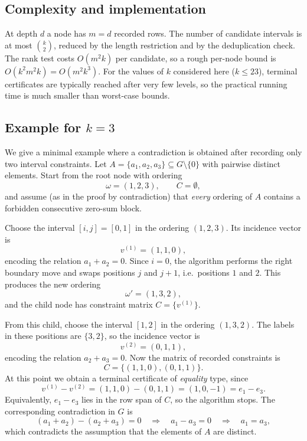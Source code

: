 \documentclass[11pt]{amsart}
\theoremstyle{definition}
\begin{document}
\subsection*{Complexity and implementation}

At depth $d$ a node has $m=d$ recorded rows.  The number of candidate intervals
is at most $\binom{k}{2}$, reduced by the length restriction and by the
deduplication check.  The rank test costs $O(m^2k)$ per candidate, so a rough
per-node bound is $O(k^2 m^2 k)=O(m^2 k^3)$.  For the values of $k$ considered
here ($k\le 23$), terminal certificates are typically reached after very few
levels, so the practical running time is much smaller than worst-case bounds.

\subsection*{Example  for $k=3$}

We give a minimal example where a contradiction is obtained after recording only
two interval constraints.  Let $A=\{a_1,a_2,a_3\}\subseteq G\setminus\{0\}$ with
pairwise distinct elements.  Start from the root node with ordering
\[
\omega=(1,2,3),\qquad C=\emptyset,
\]
and assume (as in the proof by contradiction) that \emph{every} ordering of $A$
contains a forbidden consecutive zero-sum block.

Choose the interval $[i,j]=[0,1]$ in the ordering $(1,2,3)$.  Its incidence
vector is
\[
v^{(1)}=(1,1,0),
\]
encoding the relation $a_1+a_2=0$.  Since $i=0$, the algorithm performs the
right boundary move and swaps positions $j$ and $j+1$, i.e.\ positions $1$ and
$2$.  This produces the new ordering
\[
\omega'=(1,3,2),
\]
and the child node has constraint matrix $C=\{v^{(1)}\}$.

From this child, choose the interval $[1,2]$ in the ordering $(1,3,2)$.  The
labels in these positions are $\{3,2\}$, so the incidence vector is
\[
v^{(2)}=(0,1,1),
\]
encoding the relation $a_2+a_3=0$.  Now the matrix of recorded constraints is
\[
C=\{(1,1,0),(0,1,1)\}.
\]
At this point we obtain a terminal certificate of \emph{equality} type, since
\[
v^{(1)}-v^{(2)}=(1,1,0)-(0,1,1)=(1,0,-1)=e_1-e_3.
\]
Equivalently, $e_1-e_3$ lies in the row span of $C$, so the algorithm stops.
The corresponding contradiction in $G$ is
\[
(a_1+a_2)-(a_2+a_3)=0 \quad\Longrightarrow\quad a_1-a_3=0 \quad\Longrightarrow\quad a_1=a_3,
\]
which contradicts the assumption that the elements of $A$ are distinct.
\newline
\end{document}

